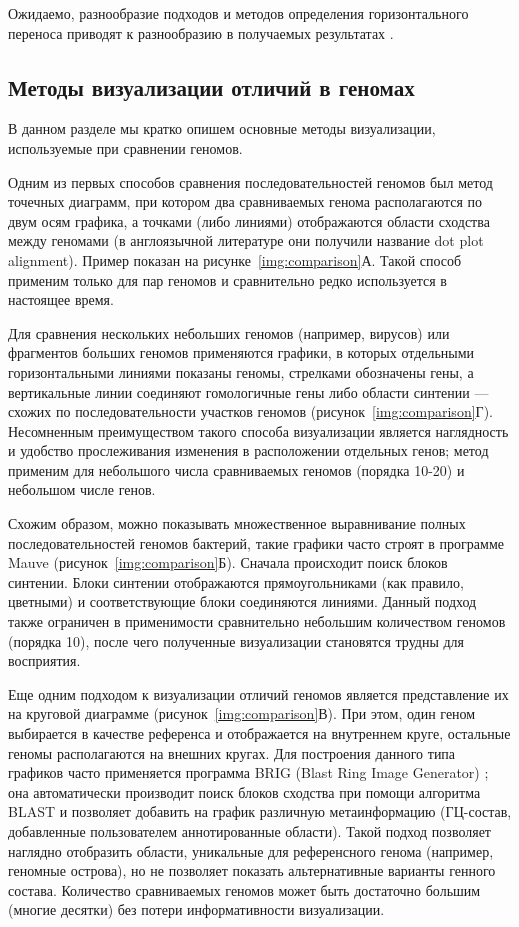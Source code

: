 Ожидаемо, разнообразие подходов и методов определения горизонтального переноса приводят к разнообразию в получаемых результатах \cite{ragan2006different}.

\subsection{Методы визуализации отличий в геномах}
В данном разделе мы кратко опишем основные методы визуализации, используемые при сравнении геномов.


Одним из первых способов сравнения последовательностей геномов был метод точечных диаграмм, при котором два сравниваемых генома располагаются по двум осям графика, а точками (либо линиями) отображаются области сходства между геномами (в англоязычной литературе они получили название dot plot alignment). Пример показан на рисунке~\ref{img:comparison}А. Такой способ применим только для пар геномов и сравнительно редко используется в настоящее время.  

Для сравнения нескольких небольших геномов (например, вирусов) или фрагментов больших геномов применяются графики, в которых отдельными горизонтальными линиями показаны геномы, стрелками обозначены гены, а вертикальные линии соединяют гомологичные гены либо области синтении --- схожих по последовательности участков геномов (рисунок~\ref{img:comparison}Г). Несомненным преимуществом такого способа визуализации является наглядность и удобство прослеживания изменения в расположении отдельных генов; метод применим для небольшого числа сравниваемых геномов (порядка 10-20) и небольшом числе генов. 

Схожим образом, можно показывать множественное выравнивание полных последовательностей геномов бактерий, такие графики часто строят в программе Mauve \cite{darling2004mauve} (рисунок~\ref{img:comparison}Б). Сначала происходит поиск блоков синтении. Блоки синтении отображаются прямоугольниками (как правило, цветными) и соответствующие блоки соединяются линиями. Данный подход также ограничен в применимости сравнительно небольшим количеством геномов (порядка 10), после чего полученные визуализации становятся трудны для восприятия. 

Еще одним подходом к визуализации отличий геномов является представление их на круговой диаграмме (рисунок~\ref{img:comparison}В). При этом, один геном выбирается в качестве референса и отображается на внутреннем круге, остальные геномы располагаются на внешних кругах. Для построения данного типа графиков часто применяется программа BRIG (Blast Ring Image Generator) \cite{alikhan2011blast}; она автоматически производит поиск блоков сходства при помощи алгоритма BLAST и позволяет добавить на график различную метаинформацию (ГЦ-состав, добавленные пользователем аннотированные области). Такой подход позволяет наглядно отобразить области, уникальные для референсного генома (например, геномные острова), но не позволяет показать альтернативные варианты генного состава. Количество сравниваемых геномов может быть достаточно большим (многие десятки) без потери информативности визуализации. 


